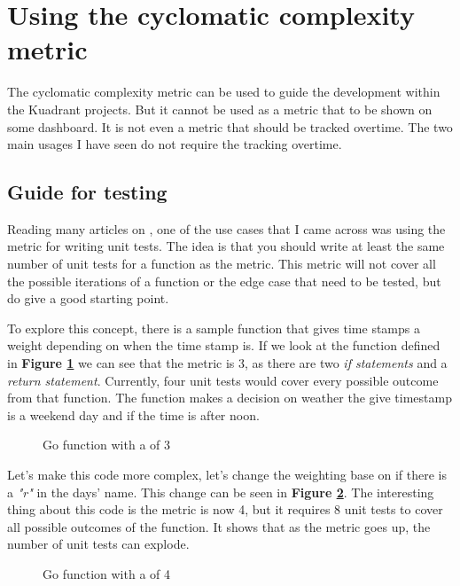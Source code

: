 \section{Using the cyclomatic complexity metric}

The cyclomatic complexity metric can be used to guide the development within the Kuadrant projects.
But it cannot be used as a metric that to be shown on some dashboard.
It is not even a metric that should be tracked overtime.
The two main usages I have seen do not require the tracking overtime.

\subsection{Guide for testing}

Reading many articles on \ccnsp, one of the use cases that I came across was using the metric for writing unit tests.
The idea is that you should write at least the same number of unit tests for a function as the \cc metric.
This metric will not cover all the possible iterations of a function or the edge case that need to be tested, but do give a good starting point.

To explore this concept, there is a sample function that gives time stamps a weight depending on when the time stamp is.
If we look at the function defined in \textbf{Figure \ref{fig:go_ex_1}} we can see that the \cc metric is 3, as there are two \textit{if statements} and a \textit{return statement}.
Currently, four unit tests would cover every possible outcome from that function.
The function makes a decision on weather the give timestamp is a weekend day and if the time is after noon.

\begin{figure}
	
	\caption{Go function with a \cc of 3}
	\label{fig:go_ex_1}
\end{figure}

Let's make this code more complex, let's change the weighting base on if there is a \textit{"r"} in the days' name.
This change can be seen in \textbf{Figure \ref{fig:go_ex_2}}.
The interesting thing about this code is the \cc metric is now 4, but it requires 8 unit tests to cover all possible outcomes of the function.
It shows that as the \cc metric goes up, the number of unit tests can explode.

\begin{figure}
	
	\caption{Go function with a \cc of 4}
	\label{fig:go_ex_2}
\end{figure}

